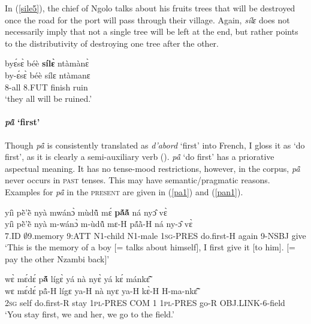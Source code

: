 \noindent In (\ref{sile5}), the chief of Ngolo talks about his fruits trees that will be destroyed once the road for the port will pass through their village. Again, {\itshape sílɛ} does not necessarily imply that not a single tree will be left at the end, but rather points to the distributivity of destroying one tree after the other.

\begin{exe} 
\ex\label{sile5} 
  \glll   byɛ́sɛ̀ béè {\bfseries sílɛ̀} ntàmànɛ̀\\
      by-ɛ́sɛ̀ béè sílɛ ntàmanɛ \\
           8-all 8.FUT finish ruin \\
    \trans `they all will be ruined.'
\end{exe}







\paragraph{{\itshape pã̂} `first'}

Though {\itshape pã̂} is consistently translated as {\itshape d'abord} `first' into French, I gloss it as `do first', as it is clearly a semi-auxiliary verb (). {\itshape pã̂} `do first' has a priorative aspectual meaning. It has no tense-mood restrictions, however, in the corpus, {\itshape pã̂} never occurs in \textsc{past} tenses.  This may have semantic/pragmatic reasons. Examples for {\itshape pã̂} in the \textsc{present} are given in (\ref{pa1}) and (\ref{pan1}). 

\begin{exe} 
\ex\label{pa1}
  \glll yíì pẽ̀'ẽ̀ nyà mwánɔ̀ mùdũ̂ mɛ́ {\bfseries pã́ã́} ná nyɔ̂ vɛ̀\\
       yíì pẽ̀'ẽ̀ nyà m-wánɔ̀ m-ùdũ̂ mɛ-H pã́ã̀-H ná ny-ɔ̂ vɛ̀ \\
      7.ID $\emptyset$9.memory 9:ATT N1-child N1-male  1\textsc{sg}-PRES do.first-H again 9-NSBJ give  \\
    \trans `This is the memory of a boy [= talks about himself], I first give it [to him]. [= pay the other Nzambi back]'
\end{exe}

\begin{exe} 
\ex\label{pan1}
  \glll   wɛ̀ mɛ́dɛ́ p{\bfseries ã́} lígɛ̀ yá nà nyɛ̀ yá kɛ́ mánkɛ̃̂  \\
         wɛ mɛ́dɛ́ pã̂-H lígɛ ya-H nà nyɛ ya-H kɛ̀-H H-ma-nkɛ̃̂  \\
           2\textsc{sg} self do.first-R stay 1\textsc{pl}-PRES COM 1  1\textsc{pl}-PRES go-R OBJ.LINK-6-field \\
    \trans `You stay first, we and her, we go to the field.'
\end{exe}

